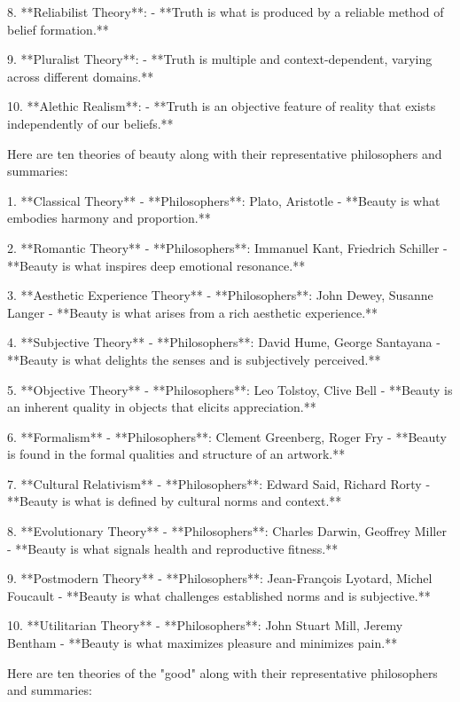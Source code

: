 8. **Reliabilist Theory**:  
   - **Truth is what is produced by a reliable method of belief formation.**

9. **Pluralist Theory**:  
   - **Truth is multiple and context-dependent, varying across different domains.**

10. **Alethic Realism**:  
    - **Truth is an objective feature of reality that exists independently of our beliefs.**




Here are ten theories of beauty along with their representative philosophers and summaries:

1. **Classical Theory**  
   - **Philosophers**: Plato, Aristotle  
   - **Beauty is what embodies harmony and proportion.**

2. **Romantic Theory**  
   - **Philosophers**: Immanuel Kant, Friedrich Schiller  
   - **Beauty is what inspires deep emotional resonance.**

3. **Aesthetic Experience Theory**  
   - **Philosophers**: John Dewey, Susanne Langer  
   - **Beauty is what arises from a rich aesthetic experience.**

4. **Subjective Theory**  
   - **Philosophers**: David Hume, George Santayana  
   - **Beauty is what delights the senses and is subjectively perceived.**

5. **Objective Theory**  
   - **Philosophers**: Leo Tolstoy, Clive Bell  
   - **Beauty is an inherent quality in objects that elicits appreciation.**

6. **Formalism**  
   - **Philosophers**: Clement Greenberg, Roger Fry  
   - **Beauty is found in the formal qualities and structure of an artwork.**

7. **Cultural Relativism**  
   - **Philosophers**: Edward Said, Richard Rorty  
   - **Beauty is what is defined by cultural norms and context.**

8. **Evolutionary Theory**  
   - **Philosophers**: Charles Darwin, Geoffrey Miller  
   - **Beauty is what signals health and reproductive fitness.**

9. **Postmodern Theory**  
   - **Philosophers**: Jean-François Lyotard, Michel Foucault  
   - **Beauty is what challenges established norms and is subjective.**

10. **Utilitarian Theory**  
    - **Philosophers**: John Stuart Mill, Jeremy Bentham  
    - **Beauty is what maximizes pleasure and minimizes pain.**



Here are ten theories of the "good" along with their representative philosophers and summaries:


